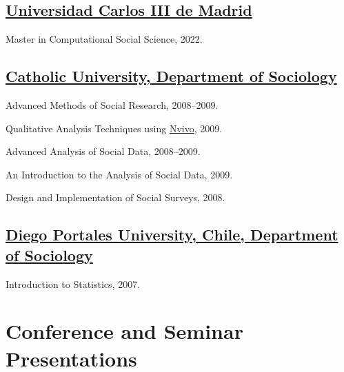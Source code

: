 \documentclass[10pt,letterpaper]{article}
\renewenvironment{itemize}{
  \begin{list}{}{
    \setlength{\leftmargin}{1.5em}
    \setlength{\itemsep}{0.25em}
    \setlength{\parskip}{0pt}
    \setlength{\parsep}{0.25em}
  }
}{
  \end{list}
}
\begin{document}
\subsection*{\href{https://www.uc3m.es/master/computational-social-science}{Universidad Carlos III de Madrid}}

\begin{itemize}
\item Master in Computational Social Science, 2022.
\end{itemize}


\subsection*{\href{http://sociologia.uc.cl/}{Catholic University, Department of Sociology}}

\begin{itemize}
\item Advanced Methods of Social Research, 2008--2009.
\item Qualitative Analysis Techniques using \href{http://www.qsrinternational.com/}{Nvivo}, 2009.
\item Advanced Analysis of Social Data, 2008--2009.
\item An Introduction to the Analysis of Social Data, 2009.
\item Design and Implementation of Social Surveys, 2008.
\end{itemize}

\subsection*{\href{http://www.udp.cl/facultades_carreras/ciencias_sociales-historia/}{Diego Portales University, Chile, Department of Sociology}}

\begin{itemize}
\item Introduction to Statistics, 2007.
\end{itemize}

\section*{Conference and Seminar Presentations}
\end{document}
